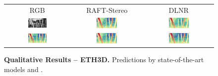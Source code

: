 \begin{figure}[h]
\begin{tabular}{ccc}
        \small RGB &
        \small RAFT-Stereo \cite{lipson2021raft} &
        \small DLNR \cite{zhao2023high} \\
        \includegraphics[width=0.31\textwidth]{imgs/ETH3D/rgb/19.jpg} & 
        \includegraphics[width=0.31\textwidth]{imgs/ETH3D/stereo/RAFT-Stereo/19.jpg} &
        \includegraphics[width=0.31\textwidth]{imgs/ETH3D/stereo/DLNR/19.jpg} \\
        \includegraphics[width=0.31\textwidth]{imgs/ETH3D/stereo/NMRF/19.jpg} &
        \includegraphics[width=0.31\textwidth]{imgs/ETH3D/stereo/Selective/19.jpg} &
        \includegraphics[width=0.31\textwidth]{imgs/ETH3D/stereo/Ours/19.jpg} \\ 
    \end{tabular}\vspace{-0.3cm}
    \caption{\textbf{Qualitative Results -- ETH3D.} Predictions by state-of-the-art models and \method.}
    \label{fig:qual_eth3d}\vspace{-0.3cm}
\end{figure}

